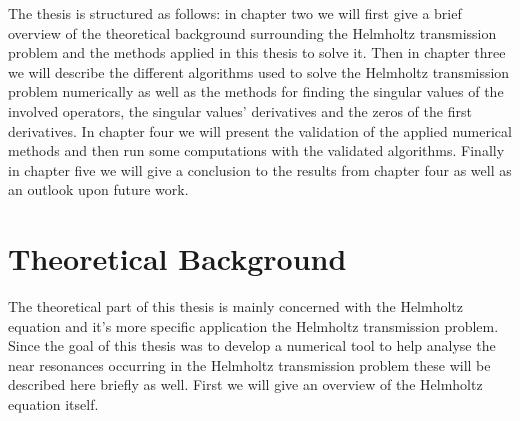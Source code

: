 \documentclass[a4paper, oneside]{discothesis}
\begin{document}
The thesis is structured as follows: in chapter two we will first give a brief overview of the theoretical background surrounding the Helmholtz transmission problem and the methods applied in this thesis to solve it.
Then in chapter three we will describe the different algorithms used to solve the Helmholtz transmission problem numerically as well as the methods for finding the singular values of the involved operators, the singular values' derivatives and the zeros of the first derivatives.
In chapter four we will present the validation of the applied numerical methods and then run some computations with the validated algorithms. 
Finally in chapter five we will give a conclusion to the results from chapter four as well as an outlook upon future work.


\chapter{Theoretical Background}
The theoretical part of this thesis is mainly concerned with the Helmholtz equation and it's more specific application the Helmholtz transmission problem.
Since the goal of this thesis was to develop a numerical tool to help analyse the near resonances occurring in the Helmholtz transmission problem these will be described here briefly as well.
First we will give an overview of the Helmholtz equation itself.
\end{document}
